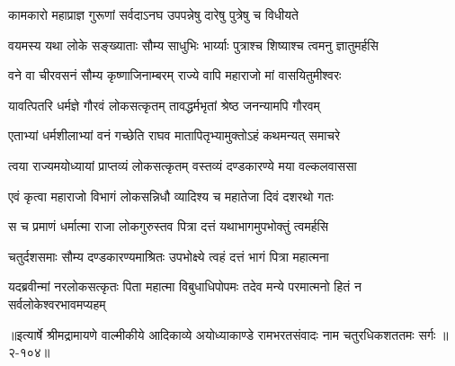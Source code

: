 \twolineshloka
{कामकारो महाप्राज्ञ गुरूणां सर्वदाऽनघ}
{उपपन्नेषु दारेषु पुत्रेषु च विधीयते} %

\twolineshloka
{वयमस्य यथा लोके सङ्ख्याताः सौम्य साधुभिः}
{भार्य्याः पुत्राश्च शिष्याश्च त्वमनु ज्ञातुमर्हसि} %

\twolineshloka
{वने वा चीरवसनं सौम्य कृष्णाजिनाम्बरम्}
{राज्ये वापि महाराजो मां वासयितुमीश्वरः} %

\twolineshloka
{यावत्पितरि धर्मज्ञे गौरवं लोकसत्कृतम्}
{तावद्धर्मभृतां श्रेष्ठ जनन्यामपि गौरवम्} %

\twolineshloka
{एताभ्यां धर्मशीलाभ्यां वनं गच्छेति राघव}
{मातापितृभ्यामुक्तोऽहं कथमन्यत् समाचरे} %

\twolineshloka
{त्वया राज्यमयोध्यायां प्राप्तव्यं लोकसत्कृतम्}
{वस्तव्यं दण्डकारण्ये मया वल्कलवाससा} %

\twolineshloka
{एवं कृत्वा महाराजो विभागं लोकसन्निधौ}
{व्यादिश्य च महातेजा दिवं दशरथो गतः} %

\twolineshloka
{स च प्रमाणं धर्मात्मा राजा लोकगुरुस्तव}
{पित्रा दत्तं यथाभागमुपभोक्तुं त्वमर्हसि} %

\twolineshloka
{चतुर्दशसमाः सौम्य दण्डकारण्यमाश्रितः}
{उपभोक्ष्ये त्वहं दत्तं भागं पित्रा महात्मना} %

\twolineshloka
{यदब्रवीन्मां नरलोकसत्कृतः पिता महात्मा विबुधाधिपोपमः}
{तदेव मन्ये परमात्मनो हितं न सर्वलोकेश्वरभावमप्यहम्} %


॥इत्यार्षे श्रीमद्रामायणे वाल्मीकीये आदिकाव्ये अयोध्याकाण्डे रामभरतसंवादः नाम चतुरधिकशततमः सर्गः ॥२-१०४॥
